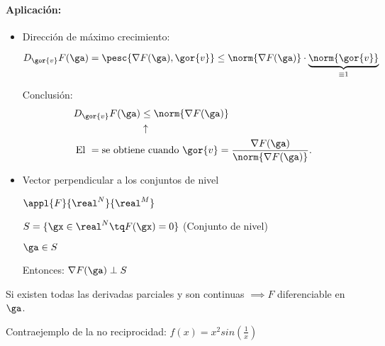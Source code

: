 \documentclass{apuntes}
\begin{document}
\paragraph{Aplicación:} 
\begin{itemize}
 \item 
 Dirección de máximo crecimiento:

$D_{\gor{v}}F(\ga) = \pesc{\nabla F(\ga),\gor{v}}\leq \norm{\nabla F(\ga)}\cdot \underbrace{\norm{\gor{v}}}_{\equiv 1}$

Conclusión:
\begin{align*}
D_{\gor{v}}F(\ga) &\leq \norm{\nabla F(\ga)}\\
&\uparrow\\
\text{El }= \text{se obtien}&\text{e cuando }\gor{v} = \displaystyle \frac{\nabla F(\ga)}{\norm{\nabla F(\ga)}}. 
\end{align*}

 
 \item
 Vector perpendicular a los conjuntos de nivel
 
 $\appl{F}{\real^N}{\real^M}$
 
 $S = \{ \gx \in \real^N \tq F(\gx) = 0\}$ (Conjunto de nivel)
 
 $\ga \in S$
 
 Entonces: $\nabla F(\ga) \perp S$
\end{itemize}

\begin{theorem}
Si existen todas las derivadas parciales y son continuas $\implies F$ diferenciable en $\ga$.
 
\end{theorem}

Contraejemplo de la no reciprocidad: $f(x) = x^2 sin\left(\frac{1}{x}\right)$
\end{document}
